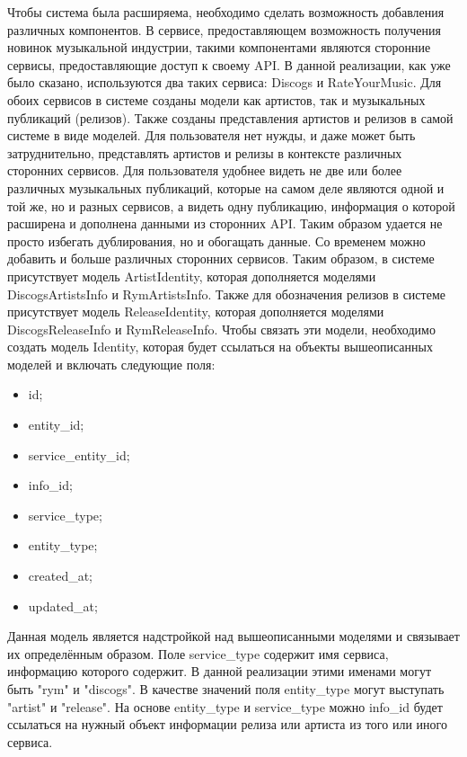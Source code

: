 Чтобы система была расширяема, необходимо сделать возможность добавления различных компонентов. В сервисе, предоставляющем возможность получения новинок музыкальной индустрии, такими компонентами являются сторонние сервисы, предоставляющие доступ к своему API. В данной реализации, как уже было сказано, используются два таких сервиса: Discogs и RateYourMusic. Для обоих сервисов в системе созданы модели как артистов, так и музыкальных публикаций (релизов). Также созданы представления артистов и релизов в самой системе в виде моделей. Для пользователя нет нужды, и даже может быть затруднительно, представлять артистов и релизы в контексте различных сторонних сервисов. Для пользователя удобнее видеть не две или более различных музыкальных публикаций, которые на самом деле являются одной и той же, но и разных сервисов, а видеть одну публикацию, информация о которой расширена и дополнена данными из сторонних API. Таким образом удается не просто избегать дублирования, но и обогащать данные. Со временем можно добавить и больше различных сторонних сервисов. Таким образом, в системе присутствует модель ArtistIdentity, которая дополняется моделями DiscogsArtistsInfo и RymArtistsInfo. Также для обозначения релизов в системе присутствует модель ReleaseIdentity, которая дополняется моделями DiscogsReleaseInfo и RymReleaseInfo. Чтобы связать эти модели, необходимо создать модель Identity, которая будет ссылаться на объекты вышеописанных моделей и включать следующие поля:

\begin{itemize}
  \item id;
  \item entity\_id;
  \item service\_entity\_id;
  \item info\_id;
  \item service\_type;
  \item entity\_type;
  \item created\_at;
  \item updated\_at;
\end{itemize}

Данная модель является надстройкой над вышеописанными моделями и связывает их определённым образом. Поле service\_type содержит имя сервиса, информацию которого содержит. В данной реализации этими именами могут быть "rym" и "discogs". В качестве значений поля entity\_type могут выступать "artist" и "release". На основе entity\_type и service\_type можно info\_id будет ссылаться на нужный объект информации релиза или артиста из того или иного сервиса.

